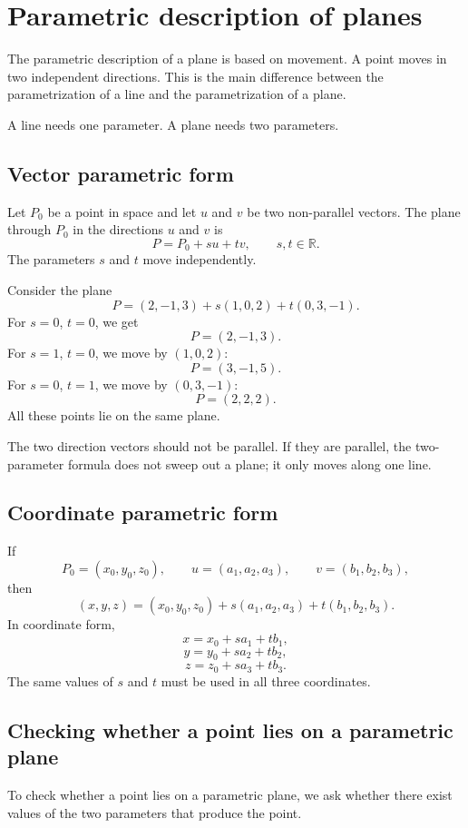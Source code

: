 \section{Parametric description of planes}

The parametric description of a plane is based on movement. A point moves in two independent directions. This is the main difference between the parametrization of a line and the parametrization of a plane.

A line needs one parameter. A plane needs two parameters.

\subsection*{Vector parametric form}

Let \(P_0\) be a point in space and let \(u\) and \(v\) be two non-parallel vectors. The plane through \(P_0\) in the directions \(u\) and \(v\) is
\[
P=P_0+s u+t v,
\qquad s,t\in\mathbb{R}.
\]
The parameters \(s\) and \(t\) move independently.

\begin{examplebox}
Consider the plane
\[
P=(2,-1,3)+s(1,0,2)+t(0,3,-1).
\]
For \(s=0\), \(t=0\), we get
\[
P=(2,-1,3).
\]
For \(s=1\), \(t=0\), we move by \((1,0,2)\):
\[
P=(3,-1,5).
\]
For \(s=0\), \(t=1\), we move by \((0,3,-1)\):
\[
P=(2,2,2).
\]
All these points lie on the same plane.
\end{examplebox}

The two direction vectors should not be parallel. If they are parallel, the two-parameter formula does not sweep out a plane; it only moves along one line.

\subsection*{Coordinate parametric form}

If
\[
P_0=(x_0,y_0,z_0),
\qquad
u=(a_1,a_2,a_3),
\qquad
v=(b_1,b_2,b_3),
\]
then
\[
(x,y,z)=(x_0,y_0,z_0)+s(a_1,a_2,a_3)+t(b_1,b_2,b_3).
\]
In coordinate form,
\[
x=x_0+sa_1+tb_1,
\]
\[
y=y_0+sa_2+tb_2,
\]
\[
z=z_0+sa_3+tb_3.
\]
The same values of \(s\) and \(t\) must be used in all three coordinates.

\subsection*{Checking whether a point lies on a parametric plane}

To check whether a point lies on a parametric plane, we ask whether there exist values of the two parameters that produce the point.

